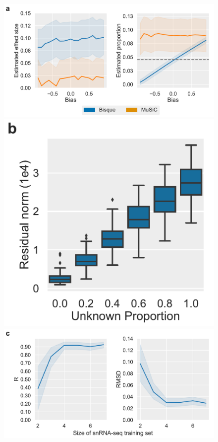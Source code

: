 \begin{figure}
\centering
\includegraphics[scale=\figscale]{chapter2/figures/supp_fig_5ab.pdf} 
\hspace*{1cm}
\includegraphics[scale=\figscale]{chapter2/figures/supp_fig_5c.pdf} 
\includegraphics[scale=0.27]{chapter2/figures/supp_fig_5d.pdf}

\end{figure}
